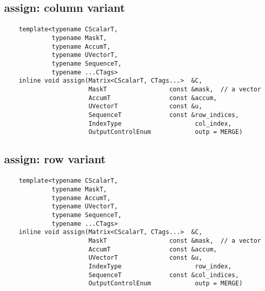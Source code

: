 \subsection{{\sf assign}: column variant}

\paragraph{\syntax}

\begin{verbatim}
    template<typename CScalarT,
             typename MaskT,
             typename AccumT,
             typename UVectorT,
             typename SequenceT,
             typename ...CTags>
    inline void assign(Matrix<CScalarT, CTags...>  &C,
                       MaskT                 const &mask,  // a vector
                       AccumT                const &accum,
                       UVectorT              const &u,
                       SequenceT             const &row_indices,
                       IndexType                    col_index,
                       OutputControlEnum            outp = MERGE)
\end{verbatim}


\subsection{{\sf assign}: row variant}

\paragraph{\syntax}

\begin{verbatim}
    template<typename CScalarT,
             typename MaskT,
             typename AccumT,
             typename UVectorT,
             typename SequenceT,
             typename ...CTags>
    inline void assign(Matrix<CScalarT, CTags...>  &C,
                       MaskT                 const &mask,  // a vector
                       AccumT                const &accum,
                       UVectorT              const &u,
                       IndexType                    row_index,
                       SequenceT             const &col_indices,
                       OutputControlEnum            outp = MERGE)
\end{verbatim}


